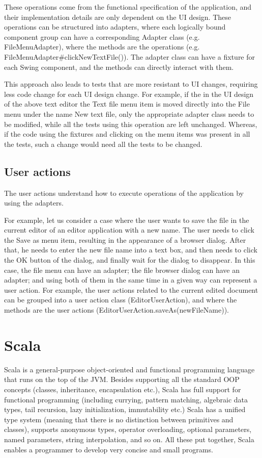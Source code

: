 These operations come from the functional specification of the application, and their implementation details are only dependent on the UI design. These operations can be structured into adapters, where each logically bound component group can have a corresponding Adapter class (e.g. FileMenuAdapter), where the methods are the operations (e.g. FileMenuAdapter\#clickNewTextFile()). The adapter class can have a fixture for each Swing component, and the methods can directly interact with them.

This approach also leads to tests that are more resistant to UI changes, requiring less code change for each UI design change. For example, if the in the UI design of the above text editor the Text file menu item is moved directly into the File menu under the name New text file, only the appropriate adapter class needs to be modified, while all the tests using this operation are left unchanged. Whereas, if the code using the fixtures and clicking on the menu items was present in all the tests, such a change would need all the tests to be changed.

\subsection {User actions}

The user actions understand how to execute operations of the application by using the adapters. 

For example, let us consider a case where the user wants to save the file in the current editor of an editor application with a new name. The user needs to click the Save as menu item, resulting in the appearance of a browser dialog. After that, he needs to enter the new file name into a text box, and then needs to click the OK button of the dialog, and finally wait for the dialog to disappear. In this case, the file menu can have an adapter; the file browser dialog can have an adapter; and using both of them in the same time in a given way can represent a user action. For example, the user actions related to the current edited document can be grouped into a user action class (EditorUserAction), and where the methods are the user actions (EditorUserAction.saveAs(newFileName)).

\section{Scala}

Scala is a general-purpose object-oriented and functional programming language that runs on the top of the JVM. Besides supporting all the standard OOP concepts (classes, inheritance, encapsulation etc.), Scala has full support for functional programming (including currying, pattern matching, algebraic data types, tail recursion, lazy initialization, immutability etc.) Scala has a unified type system (meaning that there is no distinction between primitives and classes), supports anonymous types, operator overloading, optional parameters, named parameters, string interpolation, and so on. All these put together, Scala enables a programmer to develop very concise and small programs.

